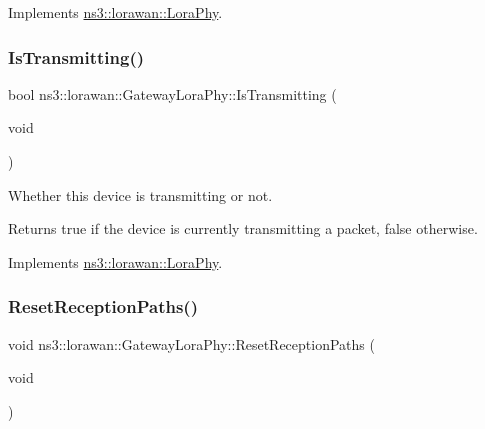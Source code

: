 Implements \hyperlink{classns3_1_1lorawan_1_1LoraPhy_a554597e30a17b099e8a7f68242cb16a7}{ns3\+::lorawan\+::\+Lora\+Phy}.

\mbox{\label{classns3_1_1lorawan_1_1GatewayLoraPhy_a9184985bc4da2d1c0cc9fedb105b20f8}} 
\subsubsection{\texorpdfstring{Is\+Transmitting()}{IsTransmitting()}}
{\footnotesize\ttfamily bool ns3\+::lorawan\+::\+Gateway\+Lora\+Phy\+::\+Is\+Transmitting (\begin{DoxyParamCaption}\item[{void}]{ }\end{DoxyParamCaption})\hspace{0.3cm}{\ttfamily [virtual]}}

Whether this device is transmitting or not.

\begin{DoxyReturn}{Returns}
true if the device is currently transmitting a packet, false otherwise. 
\end{DoxyReturn}


Implements \hyperlink{classns3_1_1lorawan_1_1LoraPhy_a5280764d934ba5ff8d305b0bc6b600ce}{ns3\+::lorawan\+::\+Lora\+Phy}.

\mbox{\label{classns3_1_1lorawan_1_1GatewayLoraPhy_aa964c821ed36fce6815910898ddfbb71}} 
\subsubsection{\texorpdfstring{Reset\+Reception\+Paths()}{ResetReceptionPaths()}}
{\footnotesize\ttfamily void ns3\+::lorawan\+::\+Gateway\+Lora\+Phy\+::\+Reset\+Reception\+Paths (\begin{DoxyParamCaption}\item[{void}]{ }\end{DoxyParamCaption})}

